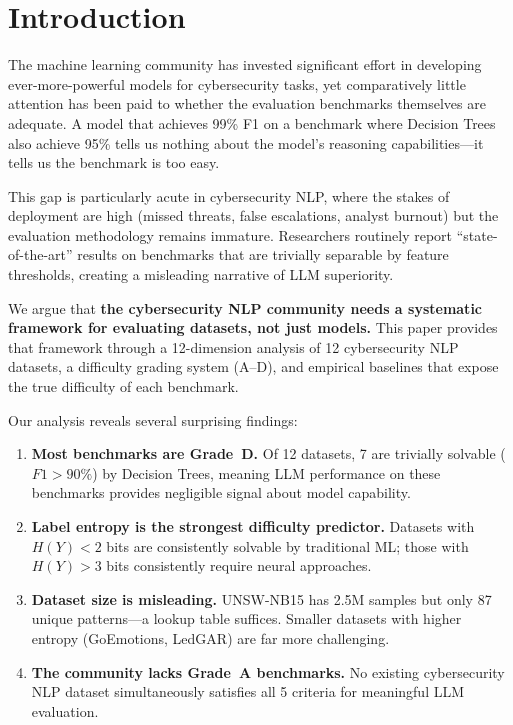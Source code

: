 \documentclass[journal]{IEEEtran}
\begin{document}
\section{Introduction}

The machine learning community has invested significant effort in developing ever-more-powerful models for cybersecurity tasks, yet comparatively little attention has been paid to whether the evaluation benchmarks themselves are adequate. A model that achieves 99\% F1 on a benchmark where Decision Trees also achieve 95\% tells us nothing about the model's reasoning capabilities---it tells us the benchmark is too easy.

This gap is particularly acute in cybersecurity NLP, where the stakes of deployment are high (missed threats, false escalations, analyst burnout) but the evaluation methodology remains immature. Researchers routinely report ``state-of-the-art'' results on benchmarks that are trivially separable by feature thresholds, creating a misleading narrative of LLM superiority.

We argue that \textbf{the cybersecurity NLP community needs a systematic framework for evaluating datasets, not just models.} This paper provides that framework through a 12-dimension analysis of 12 cybersecurity NLP datasets, a difficulty grading system (A--D), and empirical baselines that expose the true difficulty of each benchmark.

Our analysis reveals several surprising findings:
\begin{enumerate}
\item \textbf{Most benchmarks are Grade~D.} Of 12 datasets, 7 are trivially solvable ($F1 > 90\%$) by Decision Trees, meaning LLM performance on these benchmarks provides negligible signal about model capability.
\item \textbf{Label entropy is the strongest difficulty predictor.} Datasets with $H(Y) < 2$ bits are consistently solvable by traditional ML; those with $H(Y) > 3$ bits consistently require neural approaches.
\item \textbf{Dataset size is misleading.} UNSW-NB15 has 2.5M samples but only 87 unique patterns---a lookup table suffices. Smaller datasets with higher entropy (GoEmotions, LedGAR) are far more challenging.
\item \textbf{The community lacks Grade~A benchmarks.} No existing cybersecurity NLP dataset simultaneously satisfies all 5 criteria for meaningful LLM evaluation.
\end{enumerate}
\end{document}
